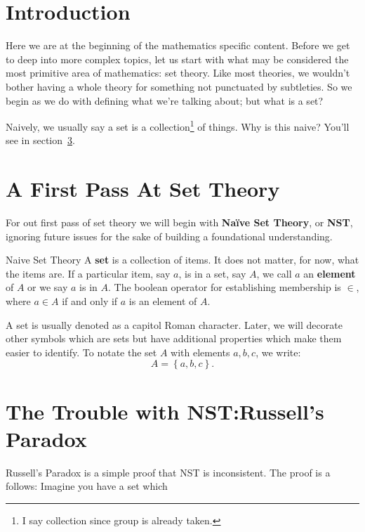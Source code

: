\section{Introduction}
Here we are at the beginning of the mathematics specific content.
Before we get to deep into more complex topics, let us start with what may be considered the most primitive area of mathematics: set theory.
Like most theories, we wouldn't bother having a whole theory for something not punctuated by subtleties.
So we begin as we do with defining what we're talking about; but what is a set?

Naively, we usually say a set is a collection\footnote{I say collection since group is already taken.} of things.
Why is this naive?
You'll see in section~\ref{set:russellsparadox}.

\section{A First Pass At Set Theory}
For out first pass of set theory we will begin with \textbf{Na\"ive Set Theory}, or \textbf{NST}, ignoring future issues for the sake of building a foundational understanding.

\begin{defn}{Naive Set Theory}
  A \textbf{set} is a collection of items.
  It does not matter, for now, what the items are.
  If a particular item, say $a$, is in a set, say $A$, we call $a$ an \textbf{element} of $A$ or we say $a$ is in $A$.
  The boolean operator for establishing membership is $\in$, where $a \in A$ if and only if $a$ is an element of $A$.

  A set is usually denoted as a capitol Roman character.
  Later, we will decorate other symbols which are sets but have additional properties which make them easier to identify.
  To notate the set $A$ with elements $a,b,c$, we write:
  $$
    A = \left\{ a, b, c\right\}.
  $$
\end{defn}




\section{The Trouble with NST:\@ Russell's Paradox}
\label{set:russellsparadox}
Russell's Paradox is a simple proof that NST is inconsistent.
The proof is a follows: Imagine you have a set which 

